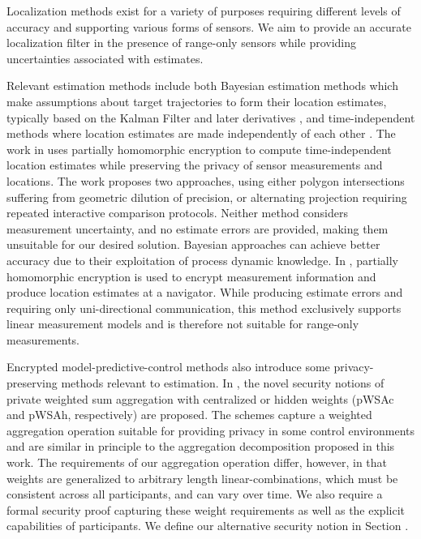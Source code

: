 \documentclass[10pt,letterpaper,oneside,twocolumn,journal]{IEEEtran}
\theoremstyle{definition}
\theoremstyle{definition}
\theoremstyle{remark}
\begin{document}

Localization methods exist for a variety of purposes requiring different levels of accuracy and supporting various forms of sensors. We aim to provide an accurate localization filter in the presence of range-only sensors while providing uncertainties associated with estimates. 

Relevant estimation methods include both Bayesian estimation methods which make assumptions about target trajectories to form their location estimates, typically based on the Kalman Filter and later derivatives \cite{kalmanNewApproachLinear1960,mutambaraDecentralizedEstimationControl1998}, and time-independent methods where location estimates are made independently of each other \cite{alanwarPrOLocResilientLocalization2017,lazosSeRLocSecureRangeindependent2004}. The work in \cite{alanwarPrOLocResilientLocalization2017} uses partially homomorphic encryption to compute time-independent location estimates while preserving the privacy of sensor measurements and locations. The work proposes two approaches, using either polygon intersections suffering from geometric dilution of precision, or alternating projection requiring repeated interactive comparison protocols. Neither method considers measurement uncertainty, and no estimate errors are provided, making them unsuitable for our desired solution. Bayesian approaches can achieve better accuracy due to their exploitation of process dynamic knowledge. In \cite{aristovEncryptedMultisensorInformation2018}, partially homomorphic encryption is used to encrypt measurement information and produce location estimates at a navigator. While producing estimate errors and requiring only uni-directional communication, this method exclusively supports linear measurement models and is therefore not suitable for range-only measurements. 

Encrypted model-predictive-control methods \cite{farokhiPrivacyDynamicalSystems2020} also introduce some privacy-preserving methods relevant to estimation. In \cite{alexandruEncryptedCooperativeControl2019,alexandruPrivateWeightedSum2020}, the novel security notions of private weighted sum aggregation with centralized or hidden weights (pWSAc and pWSAh, respectively) are proposed. The schemes capture a weighted aggregation operation suitable for providing privacy in some control environments and are similar in principle to the aggregation decomposition proposed in this work. The requirements of our aggregation operation differ, however, in that weights are generalized to arbitrary length linear-combinations, which must be consistent across all participants, and can vary over time. We also require a formal security proof capturing these weight requirements as well as the explicit capabilities of participants. We define our alternative security notion in Section .
\end{document}
